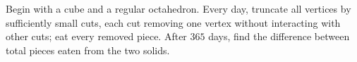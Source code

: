 Begin with a cube and a regular octahedron. Every day, truncate all vertices by sufficiently small cuts, each cut removing one vertex without interacting with other cuts; eat every removed piece. After $365$ days, find the difference between total pieces eaten from the two solids.
